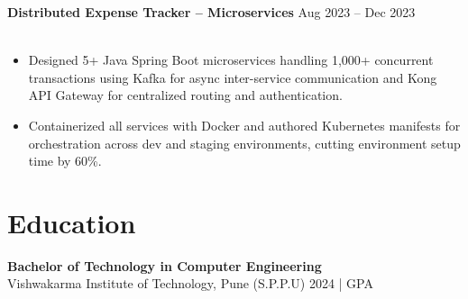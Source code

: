 \documentclass[9pt,letterpaper]{article}
\newcommand{\resumeSubheading}[4]{%
  \textbf{#1} \hfill #2 \\
  #3 \hfill #4 \\
}
\begin{document}
\resumeSubheading{Distributed Expense Tracker -- Microservices}{Aug 2023 -- Dec 2023}{}{}
\begin{itemize}
    \item Designed 5+ Java Spring Boot microservices handling 1,000+ concurrent transactions using Kafka for async inter-service communication and Kong API Gateway for centralized routing and authentication.
    \item Containerized all services with Docker and authored Kubernetes manifests for orchestration across dev and staging environments, cutting environment setup time by 60\%.
\end{itemize}

\section*{Education}
\resumeSubheading{Bachelor of Technology in Computer Engineering}{}{Vishwakarma Institute of Technology, Pune (S.P.P.U)}{2024 \enspace | \enspace 8.8 GPA}
\end{document}
